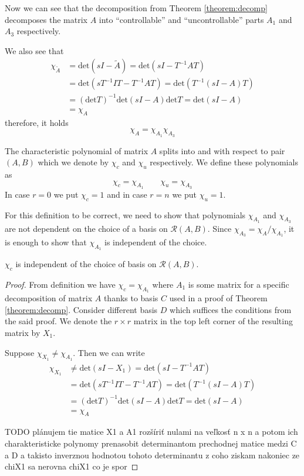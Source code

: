 Now we can see that the decomposition from Theorem \ref{theorem:decomp} decomposes the matrix $A$ into ``controllable'' and ``uncontrollable'' parts $A_1$ and $A_3$ respectively.

We also see that 
\begin{align*}
	\chi_{\widetilde{A}}&=\text{det}(sI-\widetilde{A})=\text{det}(sI-T^{-1}AT) \\
	&=\text{det}(sT^{-1}IT-T^{-1}AT)=\text{det}(T^{-1}(sI-A)T) \\
	&=(\text{det}T)^{-1}\text{det}(sI-A)\text{det}T=\text{det}(sI-A) \\
	&=\chi_A
\end{align*}
therefore, it holds $$\chi_A=\chi_{A_1}\chi_{A_3}$$ 

\begin{definition}
	The characteristic polynomial of matrix $A$ splits into  and  with respect to pair $(A,B)$ which we denote by $\chi_c$ and $\chi_u$ respectively. We define these polynomials as $$\chi_c=\chi_{A_1} \qquad \chi_u=\chi_{A_3}$$ In case $r=0$ we put $\chi_c=1$ and in case $r=n$ we put $\chi_u=1$.
\end{definition}

For this definition to be correct, we need to show that polynomials $\chi_{A_1}$ and $\chi_{A_3}$ are not dependent on the choice of a basis on $\mathcal{R}(A,B)$. Since $\chi_{A_3}=\chi_A/\chi_{A_1}$, it is enough to show that $\chi_{A_1}$ is independent of the choice.

\begin{lemma}
	$\chi_c$ is independent of the choice of basis on $\mathcal{R}(A,B)$.
\end{lemma}

\begin{proof}
	From definition we have $\chi_c=\chi_{A_1}$ where $A_1$ is some matrix for a specific decomposition of matrix $A$ thanks to basis $C$ used in a proof of Theorem \ref{theorem:decomp}. Consider different basis $D$ which suffices the conditions from the said proof. We denote the $r \times r$ matrix in the top left corner of the resulting matrix by $X_1$. 

	Suppose $\chi_{X_1}\neq \chi_{A_1}$. Then we can write 
	\begin{align*}
		\chi_{X_1}&\neq\text{det}(sI-X_1)=\text{det}(sI-T^{-1}AT) \\
		&=\text{det}(sT^{-1}IT-T^{-1}AT)=\text{det}(T^{-1}(sI-A)T) \\
		&=(\text{det}T)^{-1}\text{det}(sI-A)\text{det}T=\text{det}(sI-A) \\
		&=\chi_A
	\end{align*}

	TODO plánujem tie matice X1 a A1 rozšíriť nulami na veľkosť n x n a potom ich charakteristicke polynomy prenasobit determinantom prechodnej matice medzi C a D a takisto inverznou hodnotou tohoto determinantu z coho ziskam nakoniec ze chiX1 sa nerovna chiX1 co je spor
\end{proof}